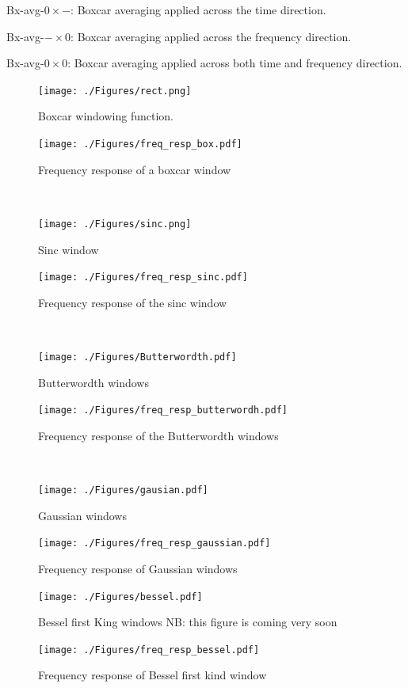 \documentclass[useAMS,usenatbib]{mn2e}
\begin{document}
Bx-avg-$0\times -$: Boxcar averaging applied across the time direction.

Bx-avg-$-\times 0$: Boxcar averaging applied across the frequency direction. 

Bx-avg-$0\times 0$: Boxcar averaging applied across both time and frequency direction.
\begin{figure}
  \centering
  \begin{minipage}{0.38\linewidth}\texttt{[image: ./Figures/rect.png]}\caption{Boxcar windowing 
function.}\label{fig:fig_box}\end{minipage}
\hspace{1cm}
\begin{minipage}{0.38\linewidth}\texttt{[image: ./Figures/freq\_resp\_box.pdf]}\caption{Frequency response of a boxcar 
window}\label{fig:fig_box_freq}\end{minipage}\\
\begin{minipage}{0.38\linewidth}\texttt{[image: ./Figures/sinc.png]}\caption{Sinc 
window}\label{fig:fig_sinc}\end{minipage}
\hspace{1cm}
\begin{minipage}{0.38\linewidth}\texttt{[image: ./Figures/freq\_resp\_sinc.pdf]}\caption{Frequency response of the 
sinc window }\label{fig:fig_sinc_freq}\end{minipage}\\
\begin{minipage}{0.38\linewidth}\texttt{[image: ./Figures/Butterwordth.pdf]}\caption{ Butterwordth 
windows}\label{fig:fig_butter}\end{minipage}
\hspace{1cm}
\begin{minipage}{0.38\linewidth}\texttt{[image: ./Figures/freq\_resp\_butterwordh.pdf]}\caption{Frequency response 
of the Butterwordth windows}\label{fig:fig_butter_freq}\end{minipage}\\
\begin{minipage}{0.38\linewidth}\texttt{[image: ./Figures/gausian.pdf]}\caption{Gaussian windows}\label{fig:fig_gauss}
\end{minipage}
\hspace{1cm}
\begin{minipage}{0.38\linewidth}\texttt{[image: ./Figures/freq\_resp\_gaussian.pdf]}\caption{Frequency response of 
Gaussian windows}\label{fig:fig_gauss_freq} \end{minipage}
\end{figure}
\begin{figure}
  \centering
\begin{minipage}{0.38\linewidth}\texttt{[image: ./Figures/bessel.pdf]}\caption{Bessel 
first King windows NB: this figure is coming very soon}\label{fig:bessel}\end{minipage}
\hspace{1cm}
\begin{minipage}{0.38\linewidth}\texttt{[image: ./Figures/freq\_resp\_bessel.pdf]}\caption{Frequency 
response of Bessel first kind window}\label{fig:freq_resp_bessel} \end {minipage}
\end{figure}
\end{document}

